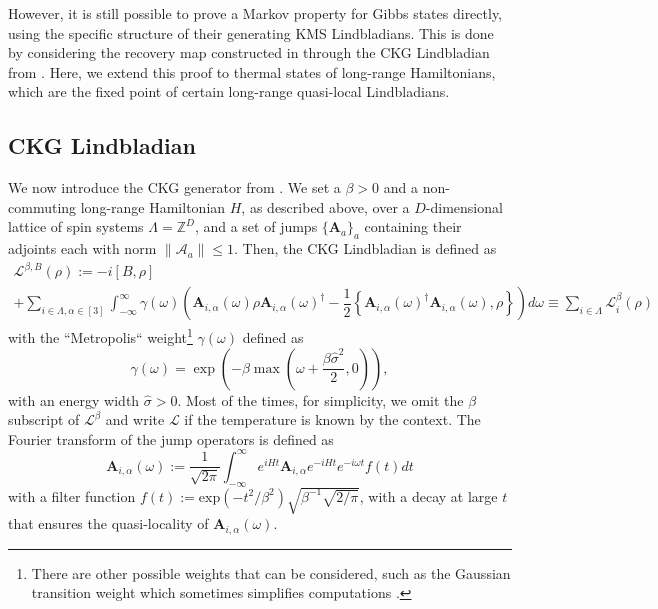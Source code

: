 \documentclass[11pt]{article}
\numberwithin{equation}{section}
\numberwithin{figure}{section}
\numberwithin{table}{section}
\theoremstyle{definition}
\theoremstyle{plain}
\theoremstyle{remark}
\newcommand{\w}{\omega}
\newcommand{\Li}{\mathcal{L}}
\newcommand{\A}{\mathcal{A}}
\newcommand{\vA}{\bm{A}}
\newcommand{\norm}[1]{\left\lVert#1\right\rVert}
\begin{document}
However, it is still possible to prove a Markov property for Gibbs states directly, using the specific structure of their generating KMS Lindbladians. This is done by considering the recovery map constructed in \cite{chen_quantum_2025} through the CKG Lindbladian from \cite{chen_efficient_2023}. Here, we extend this proof to thermal states of long-range Hamiltonians,  which are the fixed point of certain long-range quasi-local Lindbladians. 


\subsection{CKG Lindbladian}\label{subsec:CKGLindbladian}
We now introduce the CKG generator from \cite{chen_efficient_2023}. We set a $\beta >0$ and a non-commuting long-range Hamiltonian $H$, as described above, over a $D$-dimensional lattice of spin systems $\Lambda=\mathbb{Z}^D$, and a set of jumps $\{\vA_a\}_a$ containing their adjoints each with norm $\norm{\A_a}\leq 1$. Then, the CKG Lindbladian is defined as
\begin{multline}
    \Li^{\beta,B}(\rho ):=-i [B,\rho]\\
    +\sum_{i\in\Lambda,\alpha\in[3]}\int_{-\infty}^\infty\gamma(\omega) \left ( \vA_{i,\alpha}(\w)\rho \vA_{i,\alpha}(\w)^\dagger-\dfrac{1}{2}\left \{\vA_{i,\alpha}(\w)^\dagger \vA_{i,\alpha}(\w),\rho\right \}   \right)    d\omega    \equiv \sum_{i\in\Lambda}\Li_i^\beta(\rho)
\label{eq:LindbladianChen}
\end{multline}
with the ``Metropolis`` weight\footnote{There are other possible weights that can be considered, such as the Gaussian transition weight which sometimes simplifies computations \cite{chen_efficient_2023,Ding_2025}.} $\gamma(\omega)$ defined as
\begin{equation}
    \gamma(\omega)=\exp \left ( -\beta \max \left ( \w +\dfrac{\beta \hat\sigma^2}{2},0\right ) \right ),
    \label{eq:metropolisWeight}
\end{equation}
with an energy width $\hat{\sigma}>0$. Most of the times, for simplicity, we omit the $\beta $ subscript of $\Li^\beta$ and write $\Li$ if the temperature is known by the context.
The Fourier transform of the jump operators is defined as
\begin{equation}
    \vA_{i,\alpha}(\w):=\dfrac{1}{\sqrt{2\pi}}\int_{-\infty}^\infty e^{i H t}\vA_{i,\alpha}e^{-iHt}e^{-i\w t}f(t) dt
    \label{eq:defA(w)}
\end{equation}
with a filter function $f(t):=\text{exp}(-t^2/\beta^2)\sqrt{\beta^{-1}\sqrt{2/\pi}}$, with a decay at large $t$ that ensures the quasi-locality of $\vA_{i,\alpha}(\w)$. 
\end{document}
